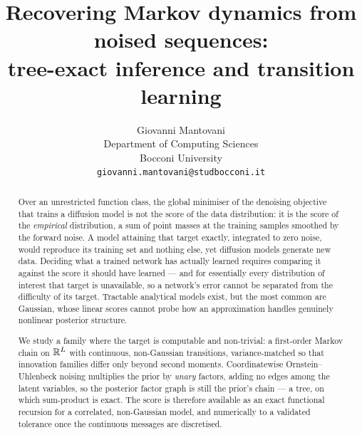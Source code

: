 \documentclass{article}
\title{Recovering Markov dynamics from noised sequences:\\
tree-exact inference and transition learning}
\author{%
  Giovanni Mantovani \\
  Department of Computing Sciences \\
  Bocconi University \\
  \texttt{giovanni.mantovani@studbocconi.it}
}
\theoremstyle{definition}
\theoremstyle{plain}
\begin{document}
\maketitle

\begin{center}
\end{center}

\begin{abstract}
Over an unrestricted function class, the global minimiser of the denoising objective that trains a
diffusion model is not the score of the data distribution: it is the score of the \emph{empirical}
distribution, a sum of point masses at the training samples smoothed by the forward noise. A model
attaining that target exactly, integrated to zero noise, would reproduce its training set and
nothing else, yet diffusion models generate new data. Deciding what a trained network has actually
learned requires comparing it against the score it should have learned --- and for essentially
every distribution of interest that target is unavailable, so a network's error cannot be
separated from the difficulty of its target. Tractable analytical models exist, but the most
common are Gaussian, whose linear scores cannot probe how an approximation handles genuinely
nonlinear posterior structure.

We study a family where the target is computable and non-trivial: a first-order Markov chain on
$\mathbb{R}^{L}$ with continuous, non-Gaussian transitions, variance-matched so that innovation
families differ only beyond second moments. Coordinatewise Ornstein--Uhlenbeck noising multiplies
the prior by \emph{unary} factors, adding no edges among the latent variables, so the posterior
factor graph is still the prior's chain --- a tree, on which sum-product is exact. The score is
therefore available as an exact functional recursion for a correlated, non-Gaussian model, and
numerically to a validated tolerance once the continuous messages are discretised.


\end{abstract}
\end{document}
